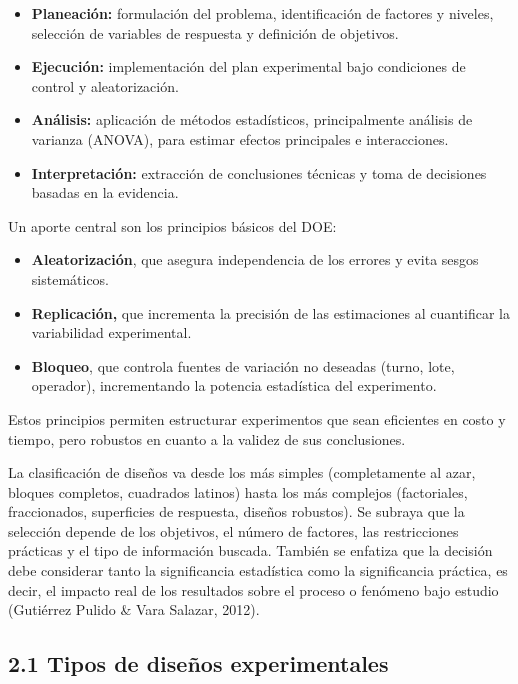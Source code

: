 \documentclass[
  spanish,
  letterpaper,
  DIV=11,
  numbers=noendperiod]{scrreprt}
\providecommand{\tightlist}{%
  \setlength{\itemsep}{0pt}\setlength{\parskip}{0pt}}
\begin{document}
\begin{itemize}
\tightlist
\item
  \textbf{Planeación:} formulación del problema, identificación de
  factores y niveles, selección de variables de respuesta y definición
  de objetivos.
\item
  \textbf{Ejecución:} implementación del plan experimental bajo
  condiciones de control y aleatorización.
\item
  \textbf{Análisis:} aplicación de métodos estadísticos, principalmente
  análisis de varianza (ANOVA), para estimar efectos principales e
  interacciones.
\item
  \textbf{Interpretación:} extracción de conclusiones técnicas y toma de
  decisiones basadas en la evidencia.
\end{itemize}

Un aporte central son los principios básicos del DOE:

\begin{itemize}
\tightlist
\item
  \textbf{Aleatorización}, que asegura independencia de los errores y
  evita sesgos sistemáticos.
\item
  \textbf{Replicación,} que incrementa la precisión de las estimaciones
  al cuantificar la variabilidad experimental.
\item
  \textbf{Bloqueo}, que controla fuentes de variación no deseadas
  (turno, lote, operador), incrementando la potencia estadística del
  experimento.
\end{itemize}

Estos principios permiten estructurar experimentos que sean eficientes
en costo y tiempo, pero robustos en cuanto a la validez de sus
conclusiones.

La clasificación de diseños va desde los más simples (completamente al
azar, bloques completos, cuadrados latinos) hasta los más complejos
(factoriales, fraccionados, superficies de respuesta, diseños robustos).
Se subraya que la selección depende de los objetivos, el número de
factores, las restricciones prácticas y el tipo de información buscada.
También se enfatiza que la decisión debe considerar tanto la
significancia estadística como la significancia práctica, es decir, el
impacto real de los resultados sobre el proceso o fenómeno bajo estudio
(Gutiérrez Pulido \& Vara Salazar, 2012).

\subsection{2.1 Tipos de diseños
experimentales}\label{tipos-de-diseuxf1os-experimentales}
\end{document}
